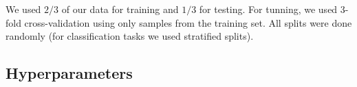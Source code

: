 We used $2/3$ of our data for training and $1/3$ for testing. For tunning, we used 3-fold cross-validation using only samples from the training set. All splits were done randomly (for classification tasks we used stratified splits).


\subsection{Hyperparameters}


